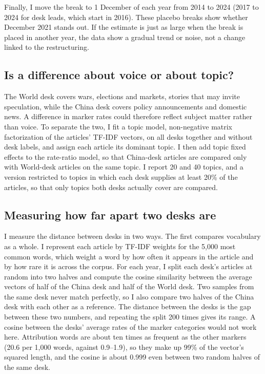 \documentclass[11pt]{article}
\begin{document}
Finally, I move the break to 1 December of each year from 2014 to 2024 (2017 to 2024 for desk leads, which start in 2016). These placebo breaks show whether December 2021 stands out. If the estimate is just as large when the break is placed in another year, the data show a gradual trend or noise, not a change linked to the restructuring.

\subsection{Is a difference about voice or about topic?}

The World desk covers wars, elections and markets, stories that may invite speculation, while the China desk covers policy announcements and domestic news. A difference in marker rates could therefore reflect subject matter rather than voice. To separate the two, I fit a topic model, non-negative matrix factorization \cite{nmf} of the articles' TF-IDF vectors, on all desks together and without desk labels, and assign each article its dominant topic. I then add topic fixed effects to the rate-ratio model, so that China-desk articles are compared only with World-desk articles on the same topic. I report 20 and 40 topics, and a version restricted to topics in which each desk supplies at least 20\% of the articles, so that only topics both desks actually cover are compared.

\subsection{Measuring how far apart two desks are}

I measure the distance between desks in two ways. The first compares vocabulary as a whole. I represent each article by TF-IDF weights for the 5,000 most common words, which weight a word by how often it appears in the article and by how rare it is across the corpus. For each year, I split each desk's articles at random into two halves and compute the cosine similarity between the average vectors of half of the China desk and half of the World desk. Two samples from the same desk never match perfectly, so I also compare two halves of the China desk with each other as a reference. The distance between the desks is the gap between these two numbers, and repeating the split 200 times gives its range. A cosine between the desks' average rates of the marker categories would not work here. Attribution words are about ten times as frequent as the other markers (20.6 per 1,000 words, against 0.9--1.9), so they make up 99\% of the vector's squared length, and the cosine is about 0.999 even between two random halves of the same desk.
\end{document}
